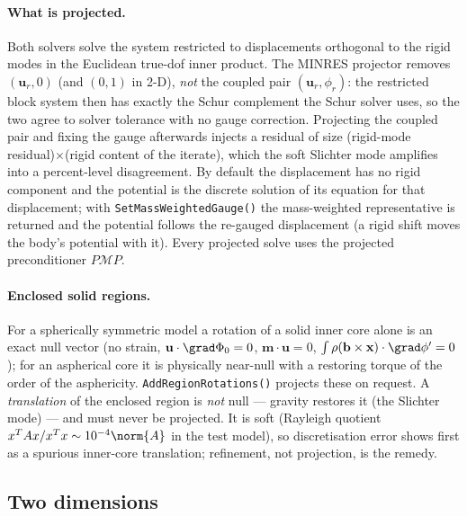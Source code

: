 \documentclass[11pt]{article}
\numberwithin{equation}{section}
\theoremstyle{remark}
\newcommand{\vu}{\mathbf{u}}
\newcommand{\vm}{\mathbf{m}}
\newcommand{\vx}{\mathbf{x}}
\newcommand{\code}[1]{\texttt{#1}}
\begin{document}
\paragraph{What is projected.} Both solvers solve the system restricted to
displacements orthogonal to the rigid modes in the Euclidean true-dof inner
product. The MINRES projector removes $(\vu_r, 0)$ (and $(0,1)$ in 2-D),
\emph{not} the coupled pair $(\vu_r,\phi_r)$: the restricted block system
then has exactly the Schur complement the Schur solver uses, so the two
agree to solver tolerance with no gauge correction. Projecting the coupled
pair and fixing the gauge afterwards injects a residual of size
(rigid-mode residual)$\times$(rigid content of the iterate), which the soft
Slichter mode amplifies into a percent-level disagreement. By default the
displacement has no rigid component and the potential is the discrete
solution of its equation for that displacement; with
\code{SetMassWeightedGauge()} the mass-weighted representative is returned
and the potential follows the re-gauged displacement (a rigid shift moves
the body's potential with it). Every projected solve uses the projected
preconditioner $P\mathcal{M}P$.

\paragraph{Enclosed solid regions.} For a spherically symmetric model a
rotation of a solid inner core alone is an exact null vector (no strain,
$\vu\cdot\grad\Phi_0 = 0$, $\vm\cdot\vu = 0$, $\int\rho(\mathbf{b}\times\vx)
\cdot\grad\phi' = 0$); for an aspherical core it is physically near-null
with a restoring torque of the order of the asphericity.
\code{AddRegionRotations()} projects these on request. A
\emph{translation} of the enclosed region is \emph{not} null --- gravity
restores it (the Slichter mode) --- and must never be projected. It is soft
(Rayleigh quotient $x^TAx/x^Tx\sim10^{-4}\norm{A}$ in the test model), so
discretisation error shows first as a spurious inner-core translation;
refinement, not projection, is the remedy.

\subsection{Two dimensions}
\label{sec:mixed-2d}
\end{document}
